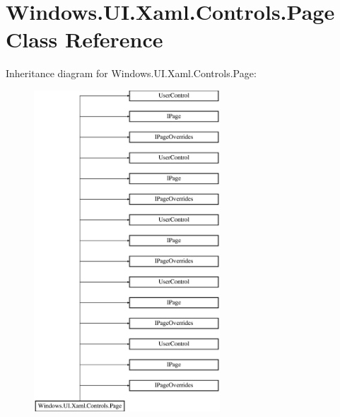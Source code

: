 \hypertarget{class_windows_1_1_u_i_1_1_xaml_1_1_controls_1_1_page}{}\section{Windows.\+U\+I.\+Xaml.\+Controls.\+Page Class Reference}
\label{class_windows_1_1_u_i_1_1_xaml_1_1_controls_1_1_page}
Inheritance diagram for Windows.\+U\+I.\+Xaml.\+Controls.\+Page\+:\begin{figure}[H]
\begin{center}
\leavevmode
\includegraphics[height=12.000000cm]{class_windows_1_1_u_i_1_1_xaml_1_1_controls_1_1_page}
\end{center}
\end{figure}
